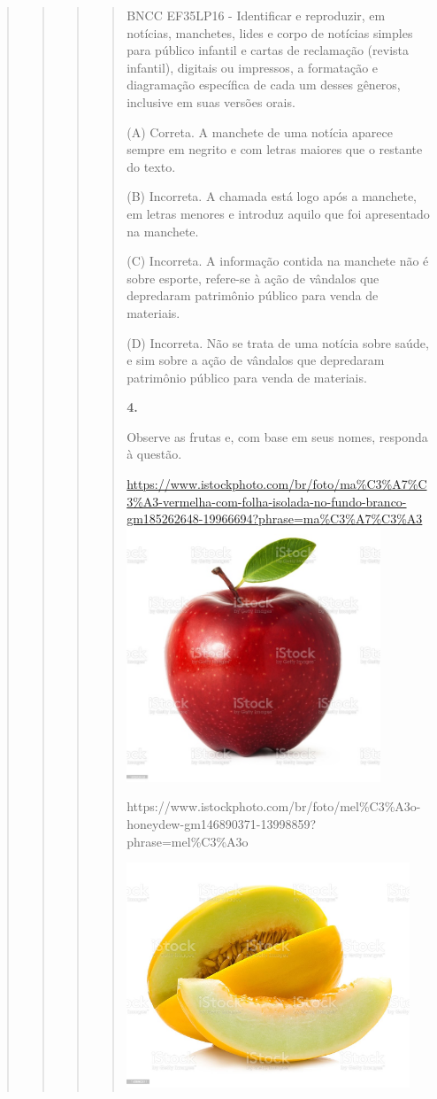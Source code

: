 \begin{quote}
\begin{quote}
\begin{quote}
\begin{quote}
BNCC EF35LP16 - Identificar e reproduzir, em notícias, manchetes, lides
e corpo de notícias simples para público infantil e cartas de reclamação
(revista infantil), digitais ou impressos, a formatação e diagramação
específica de cada um desses gêneros, inclusive em suas versões orais.

(A) Correta. A manchete de uma notícia aparece sempre em negrito e com
letras maiores que o restante do texto.

(B) Incorreta. A chamada está logo após a manchete, em letras menores e
introduz aquilo que foi apresentado na manchete.

(C) Incorreta. A informação contida na manchete não é sobre esporte,
refere-se à \protect\hypertarget{_Hlk128473874}{}{}ação de vândalos que
depredaram patrimônio público para venda de materiais.

(D) Incorreta. Não se trata de uma notícia sobre saúde, e sim sobre a
ação de vândalos que depredaram patrimônio público para venda de
materiais.

\textbf{4.}

Observe as frutas e, com base em seus nomes, responda à questão.

\href{https://www.istockphoto.com/br/foto/ma\%C3\%A7\%C3\%A3-vermelha-com-folha-isolada-no-fundo-branco-gm185262648-19966694?phrase=ma\%C3\%A7\%C3\%A3}{https://www.istockphoto.com/br/foto/ma\%C3\%A7\%C3\%A3-vermelha-com-folha-isolada-no-fundo-branco-gm185262648-19966694?phrase=ma\%C3\%A7\%C3\%A3\includegraphics[width=2.98958in,height=2.98958in]{media/image38.jpeg}}

https://www.istockphoto.com/br/foto/mel\%C3\%A3o-honeydew-gm146890371-13998859?phrase=mel\%C3\%A3o

\includegraphics[width=3.33412in,height=2.64722in]{media/image39.jpeg}


\end{quote}
\end{quote}
\end{quote}
\end{quote}
